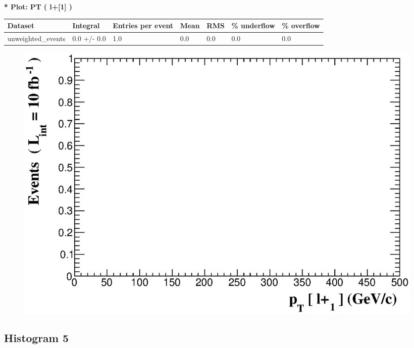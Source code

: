 \documentclass[a4paper, 10pt]{article}
\begin{document}
\textbf{* Plot: PT ( l+[1] ) }\\
   \begin{table}[H]
  \begin{center}
    \begin{tabular}{|m{23.0mm}|m{23.0mm}|m{18.0mm}|m{19.0mm}|m{19.0mm}|m{19.0mm}|m{19.0mm}|}
      \hline
      {\cellcolor{yellow}         Dataset}& {\cellcolor{yellow}         Integral}& {\cellcolor{yellow}         Entries per event}& {\cellcolor{yellow}         Mean}& {\cellcolor{yellow}         RMS}& {\cellcolor{yellow}         \% underflow}& {\cellcolor{yellow}         \% overflow}\\
      \hline
      {\cellcolor{white}         unweighted\_events}& {\cellcolor{white}         0.0 +/\-- 0.0}& {\cellcolor{white}         1.0}& {\cellcolor{white}         0.0}& {\cellcolor{white}         0.0}& {\cellcolor{green}         0.0}& {\cellcolor{green}         0.0}\\
\hline
    \end{tabular}
  \end{center}
\end{table}

\begin{figure}[H]
  \begin{center}
    \includegraphics[scale=0.45]{selection_3.eps}\\
\caption{   }
  \end{center}
\end{figure}
      \newpage
\subsection{ Histogram 5}
\end{document}
